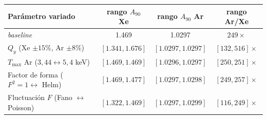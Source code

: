 \begin{tabular}{@{}>{\raggedright\arraybackslash}p{5.4cm}ccc@{}}
\toprule
Par\'ametro variado & rango $A_{90}$ Xe & rango $A_{90}$ Ar & rango Ar/Xe \\
\midrule
\emph{baseline} & 1.469 & 1.0297 & $249\times$ \\
$Q_y$ (Xe $\pm15\%$, Ar $\pm8\%$) & $[1.341,1.676]$ & $[1.0297,1.0297]$ & $[132,516]\times$ \\
$T_{\max}$ Ar ($3{,}44\leftrightarrow5{,}4$ keV) & $[1.469,1.469]$ & $[1.0296,1.0297]$ & $[250,251]\times$ \\
Factor de forma ($F^2{=}1\leftrightarrow$ Helm) & $[1.469,1.477]$ & $[1.0297,1.0298]$ & $[249,257]\times$ \\
Fluctuaci\'on $F$ (Fano $\leftrightarrow$ Poisson) & $[1.322,1.469]$ & $[1.0297,1.0299]$ & $[116,249]\times$ \\
\bottomrule
\end{tabular}

